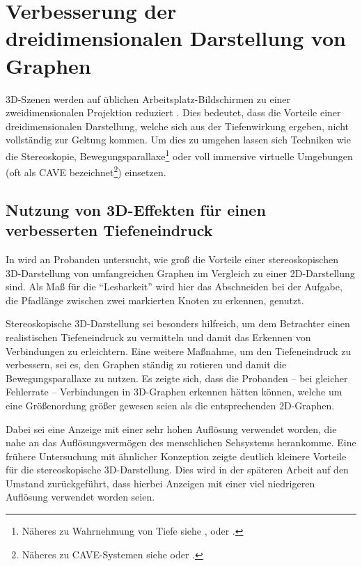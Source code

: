 \documentclass[a4paper,10pt]{sphinxmanual}
\begin{document}
\section{Verbesserung der dreidimensionalen Darstellung von Graphen}
\label{related:verbesserung-der-dreidimensionalen-darstellung-von-graphen}
3D-Szenen werden auf üblichen Arbeitsplatz-Bildschirmen zu einer zweidimensionalen Projektion reduziert \cite{akenine-moller_real-time_2008}.
Dies bedeutet, dass die Vorteile einer dreidimensionalen Darstellung, welche sich aus der Tiefenwirkung ergeben, nicht vollständig zur Geltung kommen.
Um dies zu umgehen lassen sich Techniken wie die Stereoskopie, Bewegungsparallaxe\footnote{
Näheres zu Wahrnehmung von Tiefe siehe \cite{wickens_three_1989}, \cite{wp:bewegungsparallaxe} oder \cite{wp:stereoskopie}.
} oder voll immersive virtuelle Umgebungen (oft als CAVE bezeichnet\footnote{
Näheres zu CAVE-Systemen siehe \cite{cruz-neira_surround-screen_1993} oder \cite{wpe:cave}.
}) einsetzen.


\subsection{Nutzung von 3D-Effekten für einen verbesserten Tiefeneindruck}
\label{related:nutzung-von-3d-effekten-fur-einen-verbesserten-tiefeneindruck}\label{related:ware-graphs}
In \cite{ware_visualizing_2008} wird an Probanden untersucht, wie groß die Vorteile einer stereoskopischen 3D-Darstellung von umfangreichen Graphen im Vergleich zu einer 2D-Darstellung sind.
Als Maß für die "`Lesbarkeit"' wird hier das Abschneiden bei der Aufgabe, die Pfadlänge zwischen zwei markierten Knoten zu erkennen, genutzt.

Stereoskopische 3D-Darstellung sei besonders hilfreich, um dem Betrachter einen realistischen Tiefeneindruck zu vermitteln und damit das Erkennen von Verbindungen zu erleichtern.
Eine weitere Maßnahme, um den Tiefeneindruck zu verbessern, sei es, den Graphen ständig zu rotieren und damit die Bewegungsparallaxe zu nutzen\footnotemark[2].
Es zeigte sich, dass die Probanden – bei gleicher Fehlerrate – Verbindungen in 3D-Graphen erkennen hätten können, welche um eine Größenordung größer gewesen seien als die entsprechenden 2D-Graphen.

Dabei sei eine Anzeige mit einer sehr hohen Auflösung verwendet worden, die nahe an das Auflösungsvermögen des menschlichen Sehsystems herankomme.
Eine frühere Untersuchung mit ähnlicher Konzeption \cite{ware_evaluating_1996} zeigte deutlich kleinere Vorteile für die stereoskopische 3D-Darstellung.
Dies wird in der späteren Arbeit auf den Umstand zurückgeführt, dass hierbei Anzeigen mit einer viel niedrigeren Auflösung verwendet worden seien.
\end{document}
